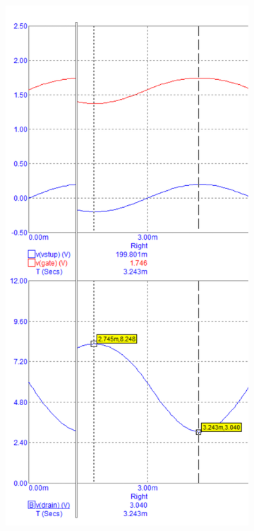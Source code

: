 \documentclass{article}
\begin{document}
\begin{figure}[H]
  \begin{minipage}[t]{0.30\textwidth}
    \begin{figure}[H]
      \includegraphics[width=\textwidth]{PC/UNI/UNI_Tranzient_1_3_redukovano.png}

\end{figure}
\end{minipage}
\end{figure}
\end{document}

